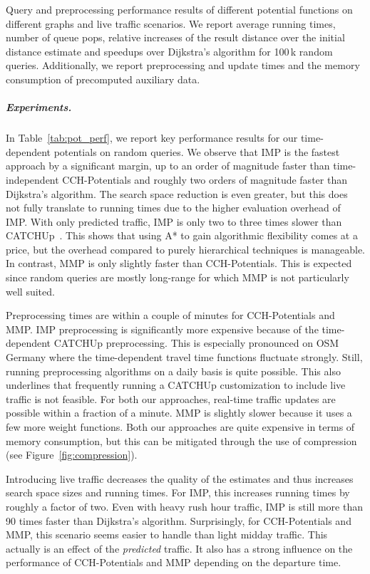 \documentclass[a4paper,UKenglish,cleveref, autoref, thm-restate,anonymous]{lipics-v2021}
\begin{document}
\begin{table}
\centering
\caption{
Query and preprocessing performance results of different potential functions on different graphs and live traffic scenarios.
We report average running times, number of queue pops, relative increases of the result distance over the initial distance estimate and speedups over Dijkstra's algorithm for 100\,k random queries.
Additionally, we report preprocessing and update times and the memory consumption of precomputed auxiliary data.
}\label{tab:pot_perf}

\end{table}

\subparagraph{Experiments.}
In Table~\ref{tab:pot_perf}, we report key performance results for our time-dependent potentials on random queries.
We observe that IMP is the fastest approach by a significant margin, up to an order of magnitude faster than time-independent CCH-Potentials and roughly two orders of magnitude faster than Dijkstra's algorithm.
The search space reduction is even greater, but this does not fully translate to running times due to the higher evaluation overhead of IMP.
With only predicted traffic, IMP is only two to three times slower than CATCHUp~\cite{swz-sfert-21}.
This shows that using A* to gain algorithmic flexibility comes at a price, but the overhead compared to purely hierarchical techniques is manageable.
In contrast, MMP is only slightly faster than CCH-Potentials.
This is expected since random queries are mostly long-range for which MMP is not particularly well suited.

Preprocessing times are within a couple of minutes for CCH-Potentials and MMP.
IMP preprocessing is significantly more expensive because of the time-dependent CATCHUp preprocessing.
This is especially pronounced on OSM Germany where the time-dependent travel time functions fluctuate strongly.
Still, running preprocessing algorithms on a daily basis is quite possible.
This also underlines that frequently running a CATCHUp customization to include live traffic is not feasible.
For both our approaches, real-time traffic updates are possible within a fraction of a minute.
MMP is slightly slower because it uses a few more weight functions.
Both our approaches are quite expensive in terms of memory consumption, but this can be mitigated through the use of compression (see Figure~\ref{fig:compression}).

Introducing live traffic decreases the quality of the estimates and thus increases search space sizes and running times.
For IMP, this increases running times by roughly a factor of two.
Even with heavy rush hour traffic, IMP is still more than 90 times faster than Dijkstra's algorithm.
Surprisingly, for CCH-Potentials and MMP, this scenario seems easier to handle than light midday traffic.
This actually is an effect of the \emph{predicted} traffic.
It also has a strong influence on the performance of CCH-Potentials and MMP depending on the departure time.
\end{document}
